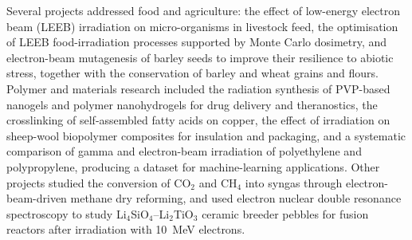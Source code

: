 Several projects addressed food and agriculture: the effect of low-energy electron beam (LEEB) irradiation on micro-organisms in livestock feed, the optimisation of LEEB food-irradiation processes supported by Monte Carlo dosimetry, and electron-beam mutagenesis of barley seeds to improve their resilience to abiotic stress, together with the conservation of barley and wheat grains and flours. Polymer and materials research included the radiation synthesis of PVP-based nanogels and polymer nanohydrogels for drug delivery and theranostics, the crosslinking of self-assembled fatty acids on copper, the effect of irradiation on sheep-wool biopolymer composites for insulation and packaging, and a systematic comparison of gamma and electron-beam irradiation of polyethylene and polypropylene, producing a dataset for machine-learning applications. Other projects studied the conversion of CO$_2$ and CH$_4$ into syngas through electron-beam-driven methane dry reforming, and used electron nuclear double resonance spectroscopy to study Li$_4$SiO$_4$--Li$_2$TiO$_3$ ceramic breeder pebbles for fusion reactors after irradiation with \SI{10}{\MeV} electrons.

